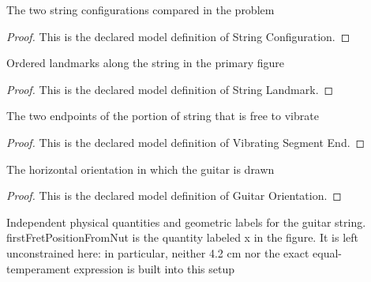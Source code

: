 \begin{definition}
  \label{def:physics:phyx-mini-0218:phyxminiproblems-problemphyxmini0218-stringconfiguration}
  The two string configurations compared in the problem
\end{definition}
\begin{proof}
  This is the declared model definition of String Configuration.
\end{proof}
\begin{definition}
  \label{def:physics:phyx-mini-0218:phyxminiproblems-problemphyxmini0218-stringlandmark}
  Ordered landmarks along the string in the primary figure
\end{definition}
\begin{proof}
  This is the declared model definition of String Landmark.
\end{proof}
\begin{definition}
  \label{def:physics:phyx-mini-0218:phyxminiproblems-problemphyxmini0218-vibratingsegmentend}
  The two endpoints of the portion of string that is free to vibrate
\end{definition}
\begin{proof}
  This is the declared model definition of Vibrating Segment End.
\end{proof}
\begin{definition}
  \label{def:physics:phyx-mini-0218:phyxminiproblems-problemphyxmini0218-guitarorientation}
  The horizontal orientation in which the guitar is drawn
\end{definition}
\begin{proof}
  This is the declared model definition of Guitar Orientation.
\end{proof}
\begin{definition}
  \label{def:physics:phyx-mini-0218:phyxminiproblems-problemphyxmini0218-guitarstringsetup}
  Independent physical quantities and geometric labels for the guitar string. firstFretPositionFromNut is the quantity labeled x in the figure. It is left unconstrained here: in particular, neither 4.2 cm nor the exact equal-temperament expression is built into this setup
\end{definition}
